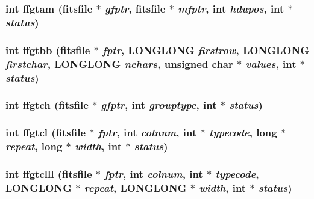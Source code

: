 \subsubsection{\setlength{\rightskip}{0pt plus 5cm}int ffgtam (\bf{fitsfile} $\ast$ {\em gfptr}, \bf{fitsfile} $\ast$ {\em mfptr}, int {\em hdupos}, int $\ast$ {\em status})}\label{fitsio_8h_ae3ed6cd81ecb5001ff6abb808607eb3}


\subsubsection{\setlength{\rightskip}{0pt plus 5cm}int ffgtbb (\bf{fitsfile} $\ast$ {\em fptr}, \bf{LONGLONG} {\em firstrow}, \bf{LONGLONG} {\em firstchar}, \bf{LONGLONG} {\em nchars}, unsigned char $\ast$ {\em values}, int $\ast$ {\em status})}\label{fitsio_8h_a5bbc15ac0a696cabe2c3b192161bdcc}


\subsubsection{\setlength{\rightskip}{0pt plus 5cm}int ffgtch (\bf{fitsfile} $\ast$ {\em gfptr}, int {\em grouptype}, int $\ast$ {\em status})}\label{fitsio_8h_d96e000e88b7c66d74535f173ebe323a}


\subsubsection{\setlength{\rightskip}{0pt plus 5cm}int ffgtcl (\bf{fitsfile} $\ast$ {\em fptr}, int {\em colnum}, int $\ast$ {\em typecode}, long $\ast$ {\em repeat}, long $\ast$ {\em width}, int $\ast$ {\em status})}\label{fitsio_8h_94467c6f6ab0cc865044556b263753a9}


\subsubsection{\setlength{\rightskip}{0pt plus 5cm}int ffgtclll (\bf{fitsfile} $\ast$ {\em fptr}, int {\em colnum}, int $\ast$ {\em typecode}, \bf{LONGLONG} $\ast$ {\em repeat}, \bf{LONGLONG} $\ast$ {\em width}, int $\ast$ {\em status})}\label{fitsio_8h_6c74e11e1c017c8f4734409364b66557}


